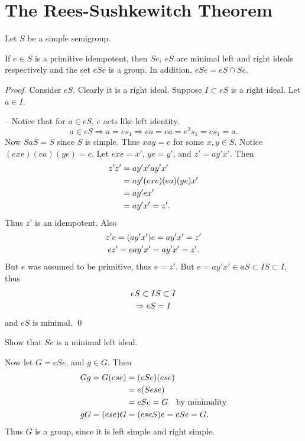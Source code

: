 

\section{The Rees-Sushkewitch Theorem}
\label{sec:2.3}


\begin{lemma}  	\label{lem:2.1}
Let $S$ be a simple semigroup.

     If $e \in S$ is a primitive idempotent, then $Se,\ eS$ are
minimal left and right ideals respectively and the set $eSe$ is a
group.  In addition, $eSe = eS \cap Se$.
\end{lemma}

\begin{proof}  
Consider $eS$.  
Clearly it is a right ideal.
Suppose $I \subset eS$ is a right ideal.  
Let $a \in I$.

-- Notice that for $a \in eS$, $e$ acts like left identity.
\[
     a \in eS \Rightarrow a = es_1 \Rightarrow ea
          = ea = e^2s_1 = es_1 = a.
\]
Now $SaS = S$ since $S$ is simple.  Thus $xay = e$ for some $x,y \in
S$.  Notice $(exe)(ea)(ye) = e$.  Let $exe = x'$, $ye = y'$, and
$z' = ay'x'$.  Then
\[
     \aligned
     z'z' &= ay'x' ay'x'                                \\
     &= ay'(exe)(ea)(ye)x'                              \\
     &= ay'ex'                                          \\
     &= ay'x' = z'.
     \endaligned
\]
Thus $z'$ is an idempotent.  
Also
\[
     \gathered
     z'e = (ay'x')e = ay'x' = z'                        \\
     ez' = eay'x' = ay'x' = z'.
     \endgathered
\]
But $e$ was assumed to be primitive, thus $e = z'$.  
But $e = ay'x' \in aS \subset IS \subset I$, thus
\[
     \gathered
     eS \subset IS \subset I                            \\
     \Rightarrow eS = I
     \endgathered
\]
and $eS$ is minimal.
\qed
\end{proof}

Show that $Se$ is a minimal left ideal.

     Now let $G = eSe$, and $g \in G$.
Then
\[
     \aligned
     G g = G(ese) &= (eSe)(ese)                    \\
     &= e(Sese)                                         \\
     &= eSe = G \quad \hbox{by minimality}              \\
     gG = (ese)G &= (eseS)e = eSe = G.
     \endaligned
\]
Thus $G$ is a group, since it is left simple and right simple.

